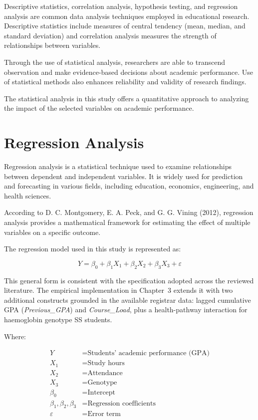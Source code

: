 \documentclass[12pt]{report}
\begin{document}
	Descriptive statistics, correlation analysis, hypothesis testing, and regression analysis are common data analysis techniques employed in educational research. Descriptive statistics include measures of central tendency (mean, median, and standard deviation) and correlation analysis measures the strength of relationships between variables.
	
	Through the use of statistical analysis, researchers are able to transcend observation and make evidence-based decisions about academic performance. Use of statistical methods also enhances reliability and validity of research findings.
	
	The statistical analysis in this study offers a quantitative approach to analyzing the impact of the selected variables on academic performance.
	
	\section{Regression Analysis}
	Regression analysis is a statistical technique used to examine relationships between dependent and independent variables. It is widely used for prediction and forecasting in various fields, including education, economics, engineering, and health sciences.
	
	According to D. C. Montgomery, E. A. Peck, and G. G. Vining (2012), regression analysis provides a mathematical framework for estimating the effect of multiple variables on a specific outcome.
	
	The regression model used in this study is represented as:
	
	\[
	Y = \beta_0 + \beta_1 X_1 + \beta_2 X_2 + \beta_3 X_3 + \varepsilon
	\]
	
	This general form is consistent with the specification adopted across
	the reviewed literature. The empirical implementation in Chapter~3
	extends it with two additional constructs grounded in the available
	registrar data: lagged cumulative GPA (\textit{Previous\_GPA}) and
	\textit{Course\_Load}, plus a health-pathway interaction for
	haemoglobin genotype SS students.
	
	Where:
	
	\begin{align*}
		Y & = \text{Students' academic performance (GPA)} \\
		X_1 & = \text{Study hours} \\
		X_2 & = \text{Attendance} \\
		X_3 & = \text{Genotype} \\
		\beta_0 & = \text{Intercept} \\
		\beta_1, \beta_2, \beta_3 & = \text{Regression coefficients} \\
		\varepsilon & = \text{Error term}
	\end{align*}
	
\end{document}
